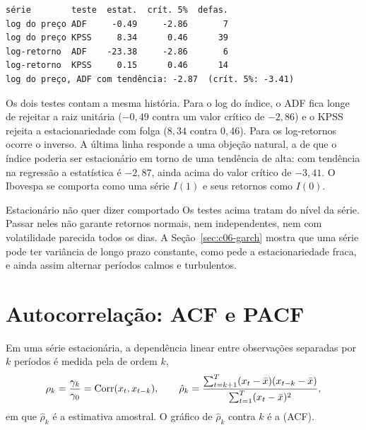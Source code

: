 \Needspace{32mm}

\Needspace{30mm}
\begin{lstlisting}[style=saida]
série        teste  estat.  crít. 5%  defas.
log do preço ADF     -0.49     -2.86       7
log do preço KPSS     8.34      0.46      39
log-retorno  ADF    -23.38     -2.86       6
log-retorno  KPSS     0.15      0.46      14
log do preço, ADF com tendência: -2.87  (crít. 5%: -3.41)
\end{lstlisting}

Os dois testes contam a mesma história. Para o log do índice, o ADF fica longe de rejeitar a raiz unitária ($-0,49$ contra um valor crítico de $-2,86$) e o KPSS rejeita a estacionariedade com folga ($8,34$ contra $0,46$). Para os log-retornos ocorre o inverso. A última linha responde a uma objeção natural, a de que o índice poderia ser estacionário em torno de uma tendência de alta: com tendência na regressão a estatística é $-2,87$, ainda acima do valor crítico de $-3,41$. O Ibovespa se comporta como uma série $I(1)$ e seus retornos como $I(0)$.

\begin{armadilha}{Estacionário não quer dizer comportado}
Os testes acima tratam do nível da série. Passar neles não garante retornos normais, nem independentes, nem com volatilidade parecida todos os dias. A Seção~\ref{sec:c06-garch} mostra que uma série pode ter variância de longo prazo constante, como pede a estacionariedade fraca, e ainda assim alternar períodos calmos e turbulentos.
\end{armadilha}

\section{Autocorrelação: ACF e PACF}
\label{sec:c06-acf}

Em uma série estacionária, a dependência linear entre observações separadas por $k$ períodos é medida pela  de ordem $k$,
\begin{equation}
  \rho_k = \frac{\gamma_k}{\gamma_0} = \operatorname{Corr}(x_t, x_{t-k}) , \qquad
  \hat\rho_k = \frac{\sum_{t=k+1}^{T} (x_t - \bar x)(x_{t-k} - \bar x)}{\sum_{t=1}^{T} (x_t - \bar x)^2} ,
  \label{eq:c06-acf}
\end{equation}
em que $\hat\rho_k$ é a estimativa amostral. O gráfico de $\hat\rho_k$ contra $k$ é a  (ACF).

